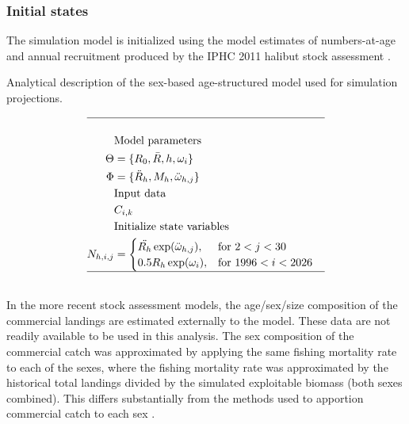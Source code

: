 \subsubsection{Initial states} %
\label{ssub:initial_states}
The simulation model is initialized using the model estimates of numbers-at-age and annual recruitment produced by the IPHC 2011 halibut stock assessment \citep{Hare2012Rara}.  

\begin{table}
	\caption{Analytical description of the sex-based age-structured model used for simulation projections.}
	\label{tab:model_description}
	\begin{center}
		\tableEq
		\begin{align}
			\hline \nonumber\\
			&\mbox{Model parameters} \nonumber\\
			\Theta &= \{R_0,\bar{R},h,\omega_{i}\} \\
			\Phi   &= \{\ddot{R}_h,M_h,\ddot{\omega}_{h,j}\} \\
			&\mbox{Input data} \nonumber\\
			&C_{i,k}\\
			&\mbox{Initialize state variables }\nonumber\\
			N_{h,i,j} &= 
			\begin{cases}
				\ddot{R_h}\exp(\ddot{\omega}_{h,j}), & \mbox{for $2<j<30$}\\
				0.5 R_h\exp(\omega_{i}), & \mbox{for $1996<i<2026$}\\
			\end{cases}\\
			\hline \nonumber
		\end{align}
		\normalEq
	\end{center}
\end{table}


In the more recent stock assessment models, the age/sex/size composition of the commercial landings are estimated externally to the model.  These data are not readily available to be used in this analysis.  The sex composition of the commercial catch was approximated by applying the same fishing mortality rate to each of the sexes, where the fishing mortality rate was approximated by the historical total landings divided by the simulated exploitable biomass (both sexes combined).  This differs substantially from the methods used to apportion commercial catch to each sex \cite[see][for details]{clark2004method}.


